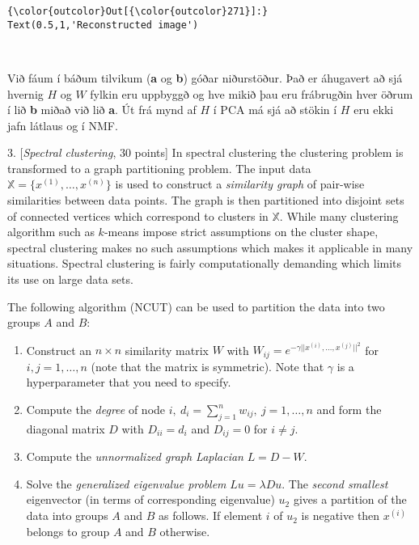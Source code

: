 \documentclass[11pt]{article}
\begin{document}
\begin{Verbatim}[commandchars=\\\{\}]
{\color{outcolor}Out[{\color{outcolor}271}]:} Text(0.5,1,'Reconstructed image')
\end{Verbatim}
            
    \begin{center}
    \end{center}
    { \hspace*{\fill} \\}
    
    Við fáum í báðum tilvikum (\textbf{a} og \textbf{b}) góðar niðurstöður.
Það er áhugavert að sjá hvernig \(H\) og \(W\) fylkin eru uppbyggð og
hve mikið þau eru frábrugðin hver öðrum í lið \textbf{b} miðað við lið
\textbf{a}. Út frá mynd af \(H\) í PCA má sjá að stökin í \(H\) eru ekki
jafn látlaus og í NMF.

    3. {[}\emph{Spectral clustering}, 30 points{]} In spectral clustering
the clustering problem is transformed to a graph partitioning problem.
The input data \(\mathbb{X}=\{x^{(1)},\ldots,x^{(n)} \}\) is used to
construct a \emph{similarity graph} of pair-wise similarities between
data points. The graph is then partitioned into disjoint sets of
connected vertices which correspond to clusters in \(\mathbb{X}\). While
many clustering algorithm such as \(k\)-means impose strict assumptions
on the cluster shape, spectral clustering makes no such assumptions
which makes it applicable in many situations. Spectral clustering is
fairly computationally demanding which limits its use on large data
sets.

The following algorithm (NCUT) can be used to partition the data into
two groups \(A\) and \(B\):

\begin{enumerate}
\def\labelenumi{\arabic{enumi})}
\item
  Construct an \(n \times n\) similarity matrix \(W\) with
  \(W_{ij}=e^{-\gamma|| x^{(i)},\ldots,x^{(j)} ||^2}\) for
  \(i,j=1,\ldots,n\) (note that the matrix is symmetric). Note that
  \(\gamma\) is a hyperparameter that you need to specify.
\item
  Compute the \emph{degree} of node
  \(i,~d_i = \sum_{j=1}^n w_{ij},~j=1,\ldots,n\) and form the diagonal
  matrix \(D\) with \(D_{ii}=d_i\) and \(D_{ij}=0\) for \(i \neq j\).
\item
  Compute the \emph{unnormalized graph Laplacian} \(L=D-W\).
\item
  Solve the \emph{generalized eigenvalue problem} \(Lu=\lambda Du\). The
  \emph{second smallest} eigenvector (in terms of corresponding
  eigenvalue) \(u_2\) gives a partition of the data into groups \(A\)
  and \(B\) as follows. If element \(i\) of \(u_2\) is negative then
  \(x^{(i)}\) belongs to group \(A\) and \(B\) otherwise.
\end{enumerate}
\end{document}
